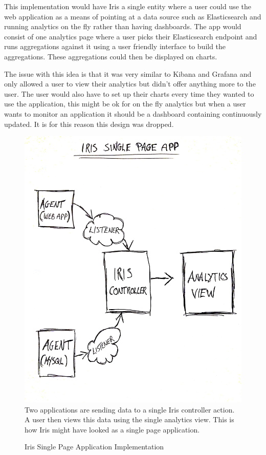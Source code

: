 \documentclass[12pt,a4paper,titlepage]{report}
\begin{document}
\begin{appendices}
This implementation would have Iris a single entity where a user could use the web application as a means of pointing at a data source such as Elasticsearch and running analytics on the fly rather than having dashboards. The app would consist of one analytics page where a user picks their Elasticsearch endpoint and runs aggregations against it using a user friendly interface to build the aggregations. These aggregations could then be displayed on charts.

The issue with this idea is that it was very similar to Kibana and Grafana and only allowed a user to view their analytics but didn’t offer anything more to the user. The user would also have to set up their charts every time they wanted to use the application, this might be ok for on the fly analytics but when a user wants to monitor an application it should be a dashboard containing continuously updated. It is for this reason this design was dropped. 

\begin{figure}[H]
\begin{tcolorbox}
\includegraphics[width=\textwidth,height=\textheight,keepaspectratio]{iris_single_page_app}
\newline
Two applications are sending data to a single Iris controller action. A user then views this data using the single analytics view. This is how Iris might have looked as a single page application.
\end{tcolorbox}
\caption{Iris Single Page Application Implementation}
\end{figure}


\end{appendices}
\end{document}

